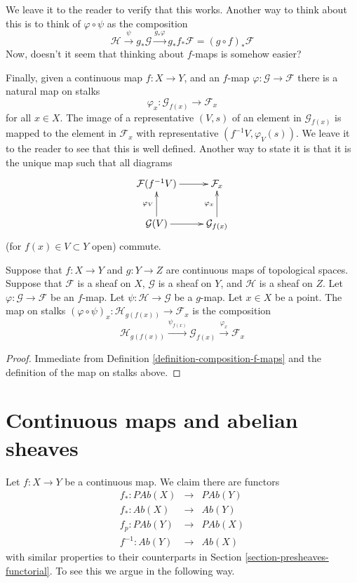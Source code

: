 \noindent
We leave it to the reader to verify that this works.
Another way to think about this is to think of
$\varphi \circ \psi$ as the composition
$$
\mathcal{H}
\xrightarrow{\psi}
g_*\mathcal{G}
\xrightarrow{g_*\varphi}
g_* f_* \mathcal{F} = (g \circ f)_* \mathcal{F}
$$
Now, doesn't it seem that thinking about $f$-maps is somehow
easier?

\medskip\noindent
Finally, given a continuous map $f : X \to Y$, and an
$f$-map $\varphi : \mathcal{G} \to \mathcal{F}$ there is
a natural map on stalks
$$
\varphi_x : \mathcal{G}_{f(x)} \longrightarrow \mathcal{F}_x
$$
for all $x \in X$. The image of a representative $(V, s)$
of an element in $\mathcal{G}_{f(x)}$ is mapped to the
element in $\mathcal{F}_x$ with representative $(f^{-1}V,
\varphi_V(s))$. We leave it to the reader to see that this
is well defined. Another way to state it is that it is the
unique map such that all diagrams
$$
\xymatrix{
\mathcal{F}(f^{-1}V) \ar[r] &
\mathcal{F}_x \\
\mathcal{G}(V) \ar[r] \ar[u]^{\varphi_V} &
\mathcal{G}_{f(x)} \ar[u]^{\varphi_x}
}
$$
(for $f(x) \in V \subset Y$ open) commute.

\begin{lemma}
\label{lemma-compose-f-maps-stalks}
Suppose that $f : X \to Y$ and $g : Y \to Z$ are continuous
maps of topological spaces. Suppose that $\mathcal{F}$ is
a sheaf on $X$, $\mathcal{G}$ is a sheaf on $Y$, and
$\mathcal{H}$ is a sheaf on $Z$.
Let $\varphi : \mathcal{G} \to \mathcal{F}$ be an $f$-map.
Let $\psi : \mathcal{H} \to \mathcal{G}$ be a $g$-map.
Let $x \in X$ be a point. The map on stalks
$(\varphi \circ \psi)_x : \mathcal{H}_{g(f(x))}
\to \mathcal{F}_x$ is the composition
$$
\mathcal{H}_{g(f(x))}
\xrightarrow{\psi_{f(x)}}
\mathcal{G}_{f(x)}
\xrightarrow{\varphi_x}
\mathcal{F}_x
$$
\end{lemma}

\begin{proof}
Immediate from Definition \ref{definition-composition-f-maps}
and the definition of the map on stalks above.
\end{proof}



\section{Continuous maps and abelian sheaves}
\label{section-abelian-presheaves-functorial}

\noindent
Let $f : X \to Y$ be a continuous map.
We claim there are functors
\begin{eqnarray*}
f_* : \textit{PAb}(X) & \longrightarrow & \textit{PAb}(Y) \\
f_* : \textit{Ab}(X) & \longrightarrow & \textit{Ab}(Y) \\
f_p : \textit{PAb}(Y) & \longrightarrow & \textit{PAb}(X) \\
f^{-1} : \textit{Ab}(Y) & \longrightarrow & \textit{Ab}(X)
\end{eqnarray*}
with similar properties to their counterparts in
Section \ref{section-presheaves-functorial}.
To see this we argue in the following way.

